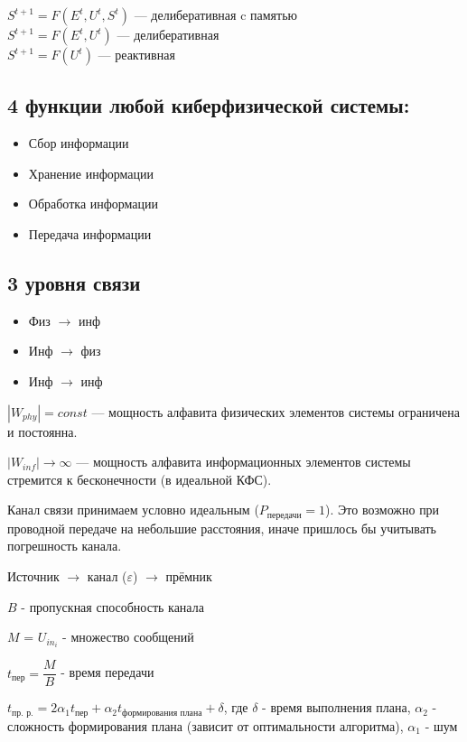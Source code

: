 \documentclass{article}
\begin{document}
\begin{sloppypar}
\begin{itemize}
              $S^{t + 1} = F(E^t, U^t, {S^{t}})$ — делиберативная c памятью \\
              $S^{t + 1} = F(E^t, U^t)$ — делиберативная \\
              $S^{t + 1} = F(U^t)$ — реактивная
    \end{itemize}

    \subsection{4 функции любой киберфизической системы:}
    \begin{itemize}
        \item Сбор информации
        \item Хранение информации
        \item Обработка информации
        \item Передача информации
    \end{itemize}

    \subsection{3 уровня связи}
    \begin{itemize}
        \item Физ $\rightarrow$ инф
        \item Инф $\rightarrow$ физ
        \item Инф $\rightarrow$ инф
    \end{itemize}

    $|W_{phy}| = const$ — мощность алфавита физических элементов системы ограничена и постоянна.

    $|W_{inf}| \rightarrow \infty$ — мощность алфавита информационных элементов системы стремится к бесконечности (в идеальной КФС).

    Канал связи принимаем условно идеальным ($P_{\text{передачи}} = 1$). Это возможно при проводной передаче на небольшие расстояния, иначе пришлось бы учитывать погрешность канала.

    Источник $\rightarrow$ канал ($\varepsilon$) $\rightarrow$ прёмник

    $B$ - пропускная способность канала

    $M$ = $U_{in_i}$ - множество сообщений

    $t_{\text{пер}} = \dfrac{M}{B}$ - время передачи

    $t_{\text{пр. р.}} = 2\alpha_1t_{\text{пер}} + \alpha_2t_{\text{формирования плана}} + \delta$, где $\delta$ - время выполнения плана, $\alpha_2$ - сложность формирования плана (зависит от оптимальности алгоритма), $\alpha_1$ - шум


\end{sloppypar}
\end{document}

